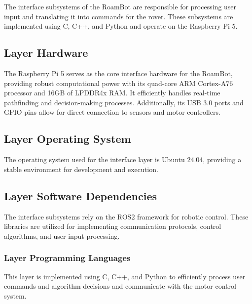 The interface subsystems of the RoamBot are responsible for processing user input and translating it into commands for the rover. These subsystems are implemented using C, C++, and Python and operate on the Raspberry Pi 5.


\subsection{Layer Hardware}
The Raspberry Pi 5 serves as the core interface hardware for the RoamBot, providing robust computational power with its quad-core ARM Cortex-A76 processor and 16GB of LPDDR4x RAM. It efficiently handles real-time pathfinding and decision-making processes. Additionally, its USB 3.0 ports and GPIO pins allow for direct connection to sensors and motor controllers.

\subsection{Layer Operating System}
The operating system used for the interface layer is Ubuntu 24.04, providing a stable environment for development and execution.

\subsection{Layer Software Dependencies}
The interface subsystems rely on the ROS2 framework for robotic control. These libraries are utilized for implementing communication protocols, control algorithms, and user input processing.

\subsubsection{Layer Programming Languages}
This layer is implemented using C, C++, and Python to efficiently process user commands and algorithm decisions and communicate with the motor control system.

